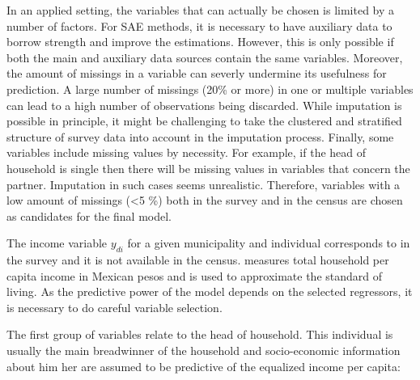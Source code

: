 In an applied setting, the variables that can actually be chosen is limited by a number of factors.
For SAE methods, it is necessary to have auxiliary data to borrow strength and improve the estimations.
However, this is only possible if both the main and auxiliary data sources contain the same variables.
Moreover, the amount of missings in a variable can severly undermine its usefulness for prediction.
A large number of missings (20\% or more) in one or multiple variables can lead to a high number of observations being discarded.
While imputation is possible in principle, it might be challenging to take the clustered and stratified structure of survey data into account in the imputation process.
Finally, some variables include missing values by necessity.
For example, if the head of household is single then there will be missing values in variables that concern the partner.
Imputation in such cases seems unrealistic.
Therefore, variables with a low amount of missings (<5 \%) both in the survey and in the census are chosen as candidates for the final model.

The income variable $y_{di}$ for a given municipality and individual corresponds to  in the survey and it is not available in the census.
 measures total household per capita income in Mexican pesos and is used to approximate the standard of living.
As the predictive power of the model depends on the selected regressors, it is necessary to do careful variable selection.


The first group of variables relate to the head of household.
This individual is usually the main breadwinner of the household and socio-economic information about him her are assumed to be predictive of the equalized income per capita:

